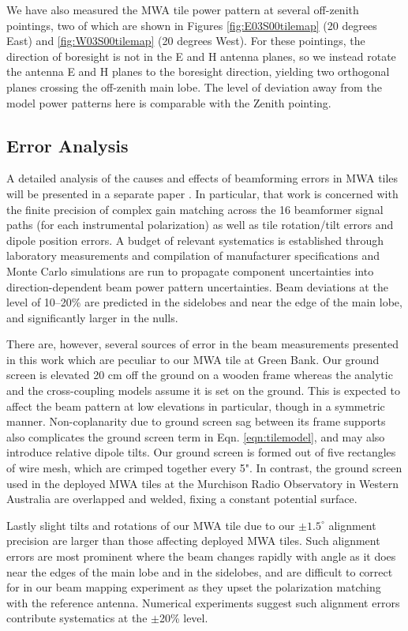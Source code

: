 We have also measured the MWA tile power pattern at several off-zenith pointings, two of which are shown in Figures \ref{fig:E03S00tilemap} (20 degrees East) and \ref{fig:W03S00tilemap} (20 degrees West). For these pointings, the direction of boresight is not in the E and H antenna planes, so we instead rotate the antenna E and H planes to the boresight direction, yielding two orthogonal planes crossing the off-zenith main lobe. The level of deviation away from the model power patterns here is comparable with the Zenith pointing. 

\subsection{Error Analysis}
\label{sec:mwaerrors}

A detailed analysis of the causes and effects of beamforming errors in MWA tiles will be presented in a separate paper \citep{neben16}. In particular, that work is concerned with the finite precision of complex gain matching across the 16 beamformer signal paths (for each instrumental polarization) as well as tile rotation/tilt errors and dipole position errors. A budget of relevant systematics is established through laboratory measurements and compilation of manufacturer specifications and Monte Carlo simulations are run to propagate component uncertainties into direction-dependent beam power pattern uncertainties. Beam deviations at the level of 10--20\% are predicted in the sidelobes and near the edge of the main lobe, and significantly larger in the nulls. 

There are, however, several sources of error in the beam measurements presented in this work which are peculiar to our MWA tile at Green Bank. Our ground screen is elevated 20 cm off the ground on a wooden frame whereas the analytic and the cross-coupling models assume it is set on the ground. This is expected to affect the beam pattern at low elevations in particular, though in a symmetric manner. Non-coplanarity due to ground screen sag between its  frame supports also complicates the ground screen term in Eqn. \ref{eqn:tilemodel}, and may also introduce relative dipole tilts. Our ground screen is formed out of five rectangles of wire mesh, which are crimped together every 5". In contrast, the ground screen used in the deployed MWA tiles at the Murchison Radio Observatory in Western Australia are overlapped and welded, fixing a constant potential surface. 

Lastly slight tilts and rotations of our MWA tile due to our $\pm1.5^\circ$ alignment precision are larger than those affecting deployed MWA tiles. Such alignment errors are most prominent where the beam changes rapidly with angle as it does near the edges of the main lobe and in the sidelobes, and are difficult to correct for in our beam mapping experiment as they upset the polarization matching with the reference antenna. Numerical experiments suggest such alignment errors contribute systematics at the $\pm$20\% level.

